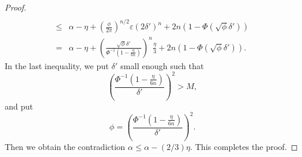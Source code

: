 \documentclass[smallextended]{svjour3}       %
\begin{document}
\begin{proof}
\begin{equation*}
\begin{split}
            \\
            \leq&
            \alpha-\eta
            +
            \left(\frac{\phi}{2\pi}\right)^{n/2}
            \varepsilon
            (2\delta')^n
            +
            2n\left(1-\Phi(\sqrt \phi \delta')\right)
            \\
            =&
            \alpha-\eta
            +
            \left(\frac{\sqrt{\phi} \delta'}{\Phi^{-1}\left(1-\frac{\eta}{6n}\right)}\right)^{n}
            \frac{\eta}{3}
            +
            2n\left(1-\Phi(\sqrt \phi \delta')\right).
        \end{split}
    \end{equation*}
    In the last inequality, we put $\delta'$ small enough such that
\begin{equation*}
    \left(\frac{\Phi^{-1}\left(1-\frac{\eta}{6n}\right)}{\delta'}\right)^2>M,
\end{equation*}
and put
    \begin{equation*}
        \phi = \left(\frac{\Phi^{-1}\left(1-\frac{\eta}{6n}\right)}{\delta'}\right)^2.
    \end{equation*}
    Then we obtain the contradiction $\alpha\leq \alpha-(2/3)\eta$.
    This completes the proof.

    
\end{proof}
\end{document}
